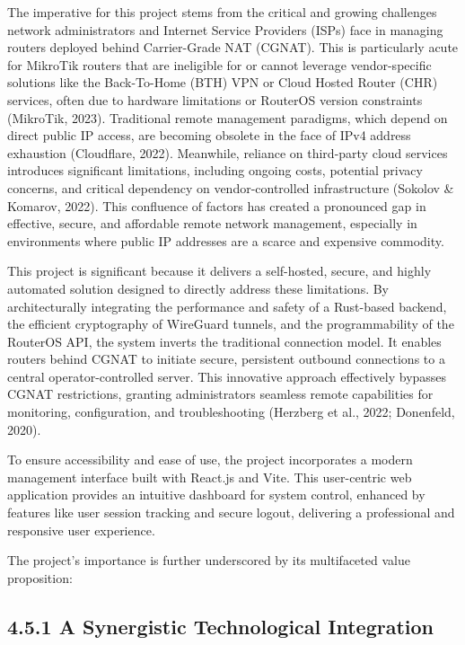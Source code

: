 \documentclass[12pt,a4paper,oneside]{report}
\begin{document}
The imperative for this project stems from the critical and growing challenges network administrators and Internet Service Providers (ISPs) face in managing routers deployed behind Carrier-Grade NAT (CGNAT). This is particularly acute for MikroTik routers that are ineligible for or cannot leverage vendor-specific solutions like the Back-To-Home (BTH) VPN or Cloud Hosted Router (CHR) services, often due to hardware limitations or RouterOS version constraints (MikroTik, 2023). Traditional remote management paradigms, which depend on direct public IP access, are becoming obsolete in the face of IPv4 address exhaustion (Cloudflare, 2022). Meanwhile, reliance on third-party cloud services introduces significant limitations, including ongoing costs, potential privacy concerns, and critical dependency on vendor-controlled infrastructure (Sokolov \& Komarov, 2022). This confluence of factors has created a pronounced gap in effective, secure, and affordable remote network management, especially in environments where public IP addresses are a scarce and expensive commodity.




This project is significant because it delivers a self-hosted, secure, and highly automated solution designed to directly address these limitations. By architecturally integrating the performance and safety of a Rust-based backend, the efficient cryptography of WireGuard tunnels, and the programmability of the RouterOS API, the system inverts the traditional connection model. It enables routers behind CGNAT to initiate secure, persistent outbound connections to a central operator-controlled server. This innovative approach effectively bypasses CGNAT restrictions, granting administrators seamless remote capabilities for monitoring, configuration, and troubleshooting (Herzberg et al., 2022; Donenfeld, 2020).




To ensure accessibility and ease of use, the project incorporates a modern management interface built with React.js and Vite. This user-centric web application provides an intuitive dashboard for system control, enhanced by features like user session tracking and secure logout, delivering a professional and responsive user experience.


The project's importance is further underscored by its multifaceted value proposition:




\subsection{4.5.1 A Synergistic Technological Integration}
\end{document}
